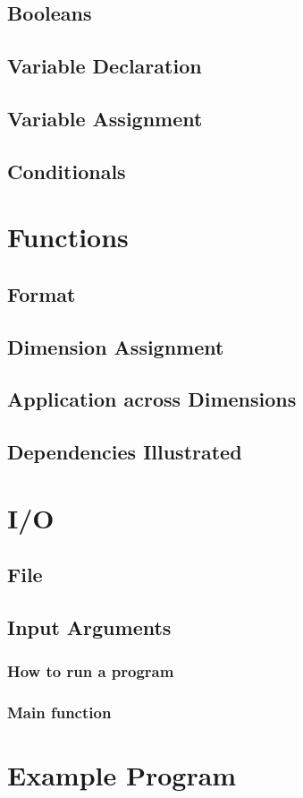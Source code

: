 \documentclass[titlepage]{article}
\begin{document}
\subsection{Booleans}
\subsection{Variable Declaration}
\subsection{Variable Assignment}
\subsection{Conditionals}
\section{Functions}
\subsection{Format}
\subsection{Dimension Assignment}
\subsection{Application across Dimensions}
\subsection{Dependencies Illustrated}
\section{I/O}
\subsection{File}
\subsection{Input Arguments}
\subsubsection{How to run a program}
\subsubsection{Main function}
\section{Example Program}
\end{document}

